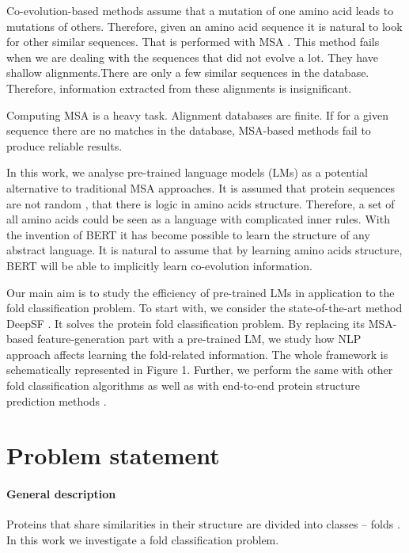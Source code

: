 \documentclass[12pt, twoside]{article}
\begin{document}
 Co-evolution-based methods assume that a mutation of one amino acid leads to mutations of others. Therefore, given an amino acid sequence it is natural to look for other similar sequences. That is performed with MSA \cite{co-evolution}. This method fails when we are dealing with the sequences that did not evolve a lot. They have shallow alignments.There are only a few similar sequences in the database. Therefore, information extracted from these alignments is insignificant. 

Computing MSA is a heavy task. Alignment databases are finite. If for a given sequence there are no matches in the database, MSA-based methods fail to produce reliable results. 

In this work, we analyse pre-trained language models (LMs)  \cite{Elnaggar} as a potential alternative to traditional MSA approaches. It is assumed that protein sequences are not random \cite{evolution-not-random}, that there is logic in amino acids structure. Therefore, a set of all amino acids could be seen as a language with complicated inner rules. With the invention of BERT \cite{bert} it has become possible to learn the structure of any abstract language. It is natural to assume that by learning amino acids structure, BERT will be able to implicitly learn co-evolution information.

Our main aim is to study the efficiency of pre-trained LMs in application to the fold classification problem.  To start with, we consider the state-of-the-art method DeepSF \cite{DeepSF}. It solves the protein fold classification problem.  By replacing its MSA-based feature-generation part with a pre-trained LM, we study how NLP approach affects learning the fold-related information.  The whole framework is schematically represented in Figure 1. Further, we perform the same with other fold classification algorithms \cite{Villegas, DeepFrag}
as well as with end-to-end protein structure prediction methods \cite{Kandathil, Xu2020.10.12.336859}.

\section{Problem statement}
\paragraph{General description}
\noindent
Proteins that share similarities in their structure are  divided into classes -- folds \cite{Schaeffer2011}. In this work we investigate a fold classification problem.  
\end{document}
